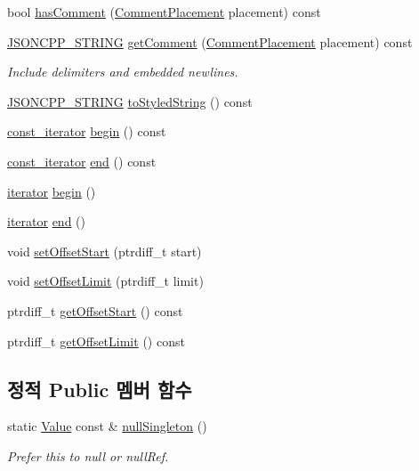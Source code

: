 \begin{DoxyCompactItemize}
bool \hyperlink{class_json_1_1_value_a65d8e3ab6a5871cbd019a3e0f0b944a3}{has\+Comment} (\hyperlink{namespace_json_a4fc417c23905b2ae9e2c47d197a45351}{Comment\+Placement} placement) const
\item 
\hyperlink{json_8h_a1e723f95759de062585bc4a8fd3fa4be}{J\+S\+O\+N\+C\+P\+P\+\_\+\+S\+T\+R\+I\+NG} \hyperlink{class_json_1_1_value_a82817229a986f0b254e31d5c83066ffe}{get\+Comment} (\hyperlink{namespace_json_a4fc417c23905b2ae9e2c47d197a45351}{Comment\+Placement} placement) const
\begin{DoxyCompactList}\small\item\em Include delimiters and embedded newlines. \end{DoxyCompactList}\item 
\hyperlink{json_8h_a1e723f95759de062585bc4a8fd3fa4be}{J\+S\+O\+N\+C\+P\+P\+\_\+\+S\+T\+R\+I\+NG} \hyperlink{class_json_1_1_value_a00154cc8662d7a845ed59e175c2496cb}{to\+Styled\+String} () const
\item 
\hyperlink{class_json_1_1_value_af92282ca92b58b320debd486afb7696a}{const\+\_\+iterator} \hyperlink{class_json_1_1_value_a015459a3950c198d63a2d3be8f5ae296}{begin} () const
\item 
\hyperlink{class_json_1_1_value_af92282ca92b58b320debd486afb7696a}{const\+\_\+iterator} \hyperlink{class_json_1_1_value_a3e443cd0ef24f7e028b175e47ee045e0}{end} () const
\item 
\hyperlink{class_json_1_1_value_a341cdf2e01f8b3c5b7317aa2f0768c53}{iterator} \hyperlink{class_json_1_1_value_a2d45bb2e68e8f22fe356d7d955ebd3c9}{begin} ()
\item 
\hyperlink{class_json_1_1_value_a341cdf2e01f8b3c5b7317aa2f0768c53}{iterator} \hyperlink{class_json_1_1_value_a2f961eff73f7f79cd29260b6cbd42558}{end} ()
\item 
void \hyperlink{class_json_1_1_value_a92e32ea0f4f8a15853a3cf0beac9feb9}{set\+Offset\+Start} (ptrdiff\+\_\+t start)
\item 
void \hyperlink{class_json_1_1_value_a5e4f5853fec138150c5df6004a8c2bcf}{set\+Offset\+Limit} (ptrdiff\+\_\+t limit)
\item 
ptrdiff\+\_\+t \hyperlink{class_json_1_1_value_afa081dc764000951a1d8d6148155508e}{get\+Offset\+Start} () const
\item 
ptrdiff\+\_\+t \hyperlink{class_json_1_1_value_a2cdfa01935f87fcace90d450cbd2c0a4}{get\+Offset\+Limit} () const
\end{DoxyCompactItemize}
\subsection*{정적 Public 멤버 함수}
\begin{DoxyCompactItemize}
\item 
static \hyperlink{class_json_1_1_value}{Value} const  \& \hyperlink{class_json_1_1_value_af2f124567acc35d021a424e53ebdfcab}{null\+Singleton} ()
\begin{DoxyCompactList}\small\item\em Prefer this to null or null\+Ref. \end{DoxyCompactList}\end{DoxyCompactItemize}
